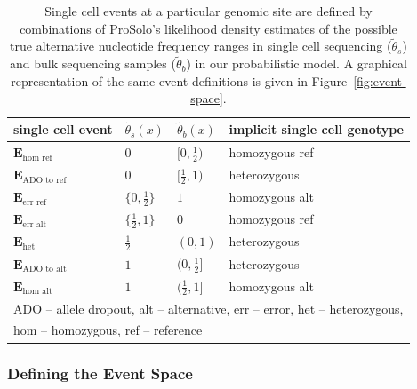 \documentclass[authoryear,preprint,11pt]{scrartcl}
\begin{document}
\begin{center}
 \begin{table}[tbp]
  \caption{
   Single cell events at a particular genomic site are defined by combinations of ProSolo's likelihood density estimates of the possible true alternative nucleotide frequency ranges in single cell sequencing ($\tilde{\theta}_s$) and bulk sequencing samples ($\tilde{\theta}_b$) in our probabilistic model.
   A graphical representation of the same event definitions is given in Figure~\ref{fig:event-space}.
  }
  \label{tab:Events}
  \renewcommand{\arraystretch}{0.9}

  \begin{tabular}{p{22ex}p{12ex}p{12ex}p{33ex}}
   \toprule
   single cell event & $\tilde{\theta}_s(x)$   & $\tilde{\theta}_b(x)$ & implicit single cell genotype \\
   \toprule
   $\boldsymbol{E}_{\text{hom ref}}$      & $0$             & $[0,\frac12)$ & homozygous ref                \\
       \midrule
   $\boldsymbol{E}_{\text{ADO to ref}}$   & $0$             & $[\frac12,1)$ & heterozygous                  \\
         \midrule
   $\boldsymbol{E}_{\text{err ref}}$      & $\{0,\frac12\}$ & $1$           & homozygous alt                \\
         \midrule
   $\boldsymbol{E}_{\text{err alt}}$      & $\{\frac12,1\}$ & $0$           & homozygous ref                \\
         \midrule
   $\boldsymbol{E}_{\text{het}}$          & $\frac12$       & $(0,1)$       & heterozygous                  \\
         \midrule
   $\boldsymbol{E}_{\text{ADO to alt}}$   & $1$             & $(0,\frac12]$ & heterozygous                  \\
       \midrule
   $\boldsymbol{E}_{\text{hom alt}}$      & $1$             & $(\frac12,1]$ & homozygous alt                \\
   \bottomrule
   \multicolumn{4}{l}{\footnotesize ADO -- allele dropout, alt -- alternative, err -- error, het -- heterozygous,}\\
   \multicolumn{4}{l}{\footnotesize hom -- homozygous, ref -- reference} \\
   \bottomrule
  \end{tabular}
 \end{table}
\end{center}

\subsubsection{Defining the Event Space}\label{sec:event-space-def}
\end{document}
